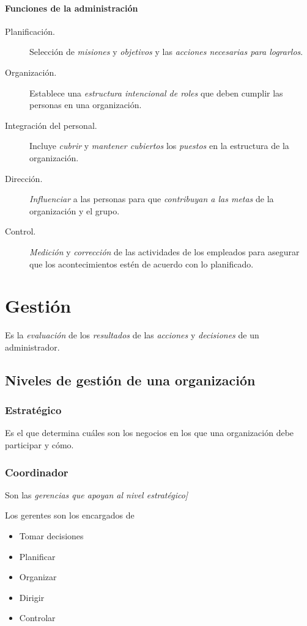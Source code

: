 \documentclass[spanish, twocolumn, twoside,openany]{book}
\begin{document}
\subsubsection{Funciones de la administración}

\begin{description}
	\item[Planificación.] Selección de \emph{misiones} y \emph{objetivos} y las \emph{acciones necesarias para lograrlos}.
	\item[Organización.] Establece una \emph{estructura intencional de roles} que deben cumplir las personas en una organización.
	\item[Integración del personal.] Incluye \emph{cubrir} y \emph{mantener cubiertos} los \emph{puestos} en la estructura de la organización.
	\item[Dirección.] \emph{Influenciar} a las personas para que \emph{contribuyan a las metas} de la organización y el grupo.
	\item[Control.] \emph{Medición} y \emph{corrección} de las actividades de los empleados para asegurar que los acontecimientos estén de acuerdo con lo planificado.
\end{description}

\chapter{Gestión}
Es la \emph{evaluación} de los \emph{resultados} de las \emph{acciones} y \emph{decisiones} de un administrador.


\section{Niveles de gestión de una organización}
\subsection{Estratégico}
Es el que determina cuáles son los negocios en los que una organización debe participar y cómo.

\subsection{Coordinador}
Son las \emph{gerencias que apoyan al nivel estratégico]}

Los gerentes son los encargados de 
\begin{itemize}
	\item Tomar decisiones
	\item Planificar
	\item Organizar
	\item Dirigir
	\item Controlar
\end{itemize}
\end{document}
